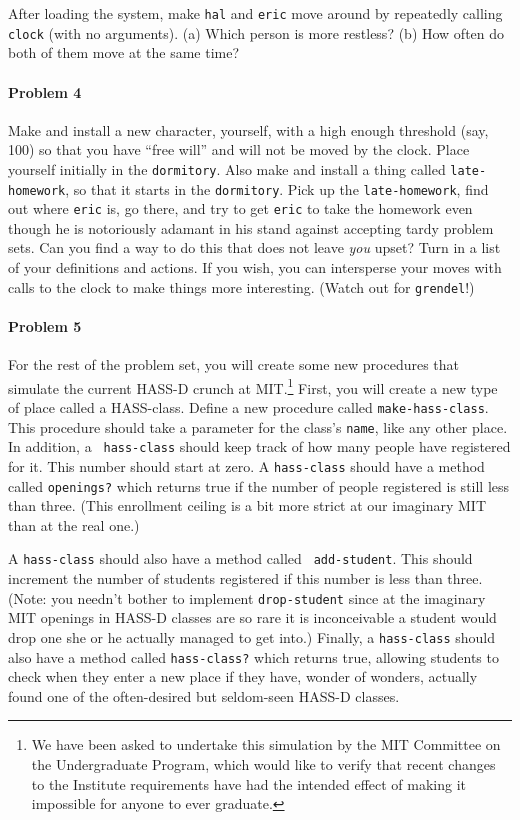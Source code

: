 After loading the system, make {\tt hal} and {\tt eric} move around by
repeatedly calling {\tt clock} (with no arguments).  (a) Which person is
more restless?  (b) How often do both of them move at the same time?

\paragraph{Problem 4}

Make and install a new character, yourself, with a high enough threshold
(say, 100) so that you have ``free will'' and will not be moved by the
clock.  Place yourself initially in the {\tt dormitory}.  Also make
and install a thing called  {\tt late-homework}, so that it starts in
the {\tt dormitory}. 
Pick up the {\tt late-homework}, find out where {\tt eric} is, go
there, and try to get {\tt eric} to take the homework even though he
is notoriously adamant in his stand against accepting tardy problem sets.
Can you find a way to do this that does not leave {\em you} upset? 
Turn in a list of your definitions and actions.  If you wish, you can
intersperse your moves with calls to the clock to make things more
interesting.  (Watch out for {\tt grendel}!)

\paragraph{Problem 5}

For the rest of the problem set, you will create some new procedures
that simulate the current HASS-D crunch at MIT.\footnote{We have been
asked to undertake this simulation by the MIT Committee on the
Undergraduate Program, which would like to verify that recent changes
to the Institute requirements have had the intended effect of making
it impossible for anyone to ever graduate.} First, you will create a
new type of place called a HASS-class.  Define a new procedure called
{\tt make-hass-class}.  This procedure should take a parameter for the
class's {\tt name}, like any other place.  In addition, a {\tt
hass-class} should keep track of how many people have registered for
it.  This number should start at zero.  A {\tt hass-class} should have
a method called {\tt openings?} which returns true if the number of
people registered is still less than three.  (This enrollment ceiling
is a bit more strict at our imaginary MIT than at the real one.)

A {\tt hass-class} should also have a method called {\tt
add-student}.  This should increment the number of students
registered if this number is less than three.  (Note: you needn't
bother to implement {\tt drop-student} since at the imaginary MIT
openings in HASS-D classes are so rare it is inconceivable a student
would drop one she or he actually managed to get into.)  Finally, a
{\tt hass-class} should also have a method called {\tt hass-class?}
which returns true, allowing students to check when they enter a new
place if they have, wonder of wonders, actually found one of the
often-desired but seldom-seen HASS-D classes. 

